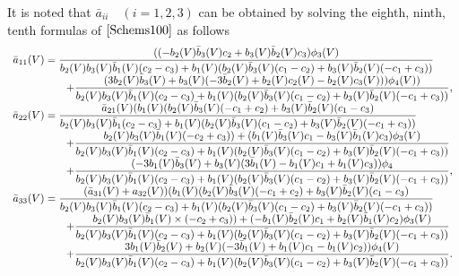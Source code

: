 \documentclass{article}
\begin{document}
 It is noted that $\bar{a}_{ii}$\ \ $(i=1,2,3)$ can be obtained by solving the eighth,
 ninth, tenth formulas of $\eqref{Schems100}$ as follows
\begin{equation}
\begin{array}
[c]{ll}
\bar{a}_{11}(V)=\dfrac{((-b_{2}(V)\bar{b}_{3}(V)c_{2}+b_{3}(V)\bar{b}_{2}(V)c_{3})\phi_{3}(V)}{b_{2}(V)b_{3}(V)\bar{b}_{1}(V)(c_{2}-c_{3})+b_{1}(V)(b_{2}(V)\bar{b}_{3}(V)(c_{1}-c_{2})+b_{3}(V)\bar{b}_{2}(V)(-c_{1}+c_{3}))}\\
\ \ \ \ \ \ \ \ \ \ \ \ \ \ \
+\dfrac{(3b_{2}(V)\bar{b}_{3}(V)+b_{3}(V)(-3\bar{b}_{2}(V)+b_{2}(V)c_{2}(V)
-b_{2}(V)c_{3}(V)))\phi_{4}(V))}{b_{2}(V)b_{3}(V)\bar{b}_{1}(V)(c_{2}-c_{3})+b_{1}(V)(b_{2}(V)\bar{b}_{3}(V)(c_{1}-c_{2})+b_{3}(V)\bar{b}_{2}(V)(-c_{1}+c_{3}))},\\
\bar{a}_{22}(V)=\dfrac{\bar{a}_{21}(V)(b_{1}(V)(b_{2}(V)\bar{b}_{3}(V)(-c_{1}+c_{2})+b_{3}(V)\bar{b}_{2}(V)(c_{1}-c_{3})}{b_{2}(V)b_{3}(V)\bar{b}_{1}(c_{2}-c_{3})
+b_{1}(V)(b_{2}(V)\bar{b}_{3}(V)(c_{1}-c_{2})+b_{3}(V)\bar{b}_{2}(V)(-c_{1}+c_{3}))}\\
\ \ \ \ \ \ \ \ \ \ \ \ \ \ \
+\dfrac{b_{2}(V)b_{3}(V)\bar{b}_{1}(V)(-c_{2}+c_{3}))
+(b_{1}(V)\bar{b}_{3}(V)c_{1}-b_{3}(V)\bar{b}_{1}(V)c_{3})\phi_{3}(V)}{b_{2}(V)b_{3}(V)\bar{b}_{1}(V)(c_{2}-c_{3})
+b_{1}(V)(b_{2}(V)\bar{b}_{3}(V)(c_{1}-c_{2})+b_{3}(V)\bar{b}_{2}(V)(-c_{1}+c_{3}))}\\
\ \ \ \ \ \ \ \ \ \ \ \ \ \ \
+\dfrac{(-3b_{1}(V)\bar{b}_{3}(V)+b_{3}(V)(3\bar{b}_{1}(V)-b_{1}(V)c_{1}+b_{1}(V)c_{3}))\phi_{4}}{b_{2}(V)b_{3}(V)\bar{b}_{1}(V)(c_{2}-c_{3})
+b_{1}(V)(b_{2}(V)\bar{b}_{3}(V)(c_{1}-c_{2})+b_{3}(V)\bar{b}_{2}(V)(-c_{1}+c_{3}))}
 ,\\

\bar{a}_{33}(V)=\dfrac{(\bar{a}_{31}(V)+a_{32}(V))(b_{1}(V)(b_{2}(V)\bar{b}_{3}(V)(-c_{1}+c_{2})+b_{3}(V)\bar{b}_{2}(V)(c_{1}-c_{3})}{b_{2}(V)b_{3}(V)\bar{b}_{1}(V)(c_{2}-c_{3})+b_{1}(V)(b_{2}(V)\bar{b}_{3}(V)(c_{1}-c_{2})+b_{3}(V)\bar{b}_{2}(V)(-c_{1}+c_{3}))}\\
\ \ \ \ \ \ \ \ \ \ \ \ \ \ \ +\dfrac{b_{2}(V)b_{3}(V)\bar{b}_{1}(V)
\times(-c_{2}+c_{3}))+(-b_{1}(V)\bar{b}_{2}(V)c_{1}+b_{2}(V)\bar{b}_{1}(V)c_{2})\phi_{3}(V)}{b_{2}(V)b_{3}(V)\bar{b}_{1}(V)(c_{2}-c_{3})+b_{1}(V)(b_{2}(V)\bar{b}_{3}(V)(c_{1}-c_{2})+b_{3}(V)\bar{b}_{2}(V)(-c_{1}+c_{3}))}\\
\ \ \ \ \ \ \ \ \ \ \ \ \ \ \
+\dfrac{3b_{1}(V)\bar{b}_{2}(V)+b_{2}(V)(-3\bar{b}_{1}(V)+b_{1}(V)c_{1}-b_{1}(V)c_{2}))\phi_{4}(V)}{b_{2}(V)b_{3}(V)\bar{b}_{1}(V)(c_{2}-c_{3})+b_{1}(V)(b_{2}(V)\bar{b}_{3}(V)(c_{1}-c_{2})+b_{3}(V)\bar{b}_{2}(V)(-c_{1}+c_{3}))}.
\end{array}
\label{ekrnB}%
\end{equation}
\end{document}
